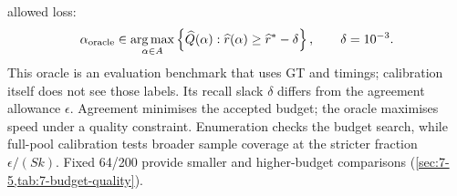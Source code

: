 allowed loss:
\begin{equation}
 \alpha_{\rm oracle}\in\operatorname*{arg\,max}_{\alpha\in A}
 \left\{\widehat Q(\alpha):
 \widehat r(\alpha)\geq\widehat r^*-\delta\right\},\qquad\delta=10^{-3}.
 \label{eq:6-oracle}
\end{equation}
This oracle is an evaluation benchmark that uses GT and timings;
calibration itself does not see those labels. Its recall slack $\delta$
differs from the agreement allowance $\epsilon$. Agreement minimises
the accepted budget; the oracle maximises speed under a quality constraint.
Enumeration checks the budget search, while full-pool calibration tests
broader sample coverage at the stricter fraction $\epsilon/(Sk)$.
Fixed 64/200 provide smaller and higher-budget comparisons
(\cref{sec:7-5,tab:7-budget-quality}).
